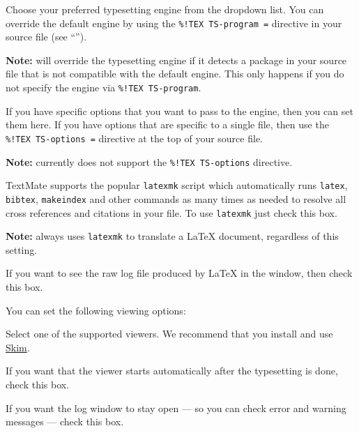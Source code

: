 \documentclass[11pt, x11names]{article}
\begin{document}
\begin{description}[style=multiline, leftmargin=4cm]

    \item[Default Engine] Choose your preferred typesetting engine from the dropdown list. You can override the default engine by using the \texttt{\%!TEX\ TS-program\ =} directive in your source file (see “”).

    \textbf{Note:}  will override the typesetting engine if it detects a package in your source file that is not compatible with the default engine. This only happens if you do not specify the engine via \texttt{\%!TEX\ TS-program}.

    \item[Options] If you have specific options that you want to pass to the engine, then you can set them here. If you have options that are specific to a single file, then use the \texttt{\%!TEX\ TS-options\ =} directive at the top of your source file.

    \textbf{Note:}  currently does not support the \texttt{\%!TEX\ TS-options} directive.

    \item[Use Latexmk] TextMate supports the popular \texttt{latexmk} script which automatically runs \texttt{latex}, \texttt{bibtex}, \texttt{makeindex} and other commands as many times as needed to resolve all cross references and citations in your file. To use \texttt{latexmk} just check this box.

    \textbf{Note:}  always uses \texttt{latexmk} to translate a LaTeX document, regardless of this setting.

    \item[Verbose TeX output] If you want to see the raw log file produced by LaTeX in the  window, then check this box.

\end{description}

You can set the following viewing options:

\begin{description}[style=multiline, leftmargin=5cm]

    \item[View in] Select one of the supported viewers. We recommend that you install and use \href{http://skim-app.sourceforge.net}{Skim}.

    \item[Show PDF automatically] If you want that the viewer starts automatically after the typesetting is done, check this box.

    \item[Keep log window open] If you want the log window to stay open — so you can check error and warning messages — check this box.

\end{description}
\end{document}
